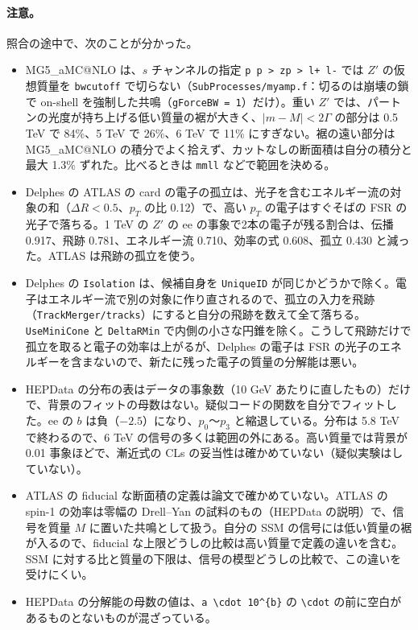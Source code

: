 \documentclass[a4paper,10pt]{ltjsarticle}
\makeatletter
\newcommand{\MGaMC}{MG5\_aMC@NLO}
\makeatother
\begin{document}
\paragraph{注意。}照合の途中で、次のことが分かった。
\begin{itemize}
\item \MGaMC{} は、$s$ チャンネルの指定 \texttt{p p > zp > l+ l-} では $Z'$ の仮想質量を \texttt{bwcutoff} で切らない（\texttt{SubProcesses/myamp.f}：切るのは崩壊の鎖で on-shell を強制した共鳴（\texttt{gForceBW = 1}）だけ）。重い $Z'$ では、パートンの光度が持ち上げる低い質量の裾が大きく、$|m-M|<2\Gamma$ の部分は 0.5 TeV で 84\%、5 TeV で 26\%、6 TeV で 11\% にすぎない。裾の遠い部分は \MGaMC{} の積分でよく拾えず、カットなしの断面積は自分の積分と最大 1.3\% ずれた。比べるときは \texttt{mmll} などで範囲を決める。
\item Delphes の ATLAS の card の電子の孤立は、光子を含むエネルギー流の対象の和（$\Delta R<0.5$、$p_T$ の比 0.12）で、高い $p_T$ の電子はすぐそばの FSR の光子で落ちる。1 TeV の $Z'$ の ee の事象で2本の電子が残る割合は、伝播 0.917、飛跡 0.781、エネルギー流 0.710、効率の式 0.608、孤立 0.430 と減った。ATLAS は飛跡の孤立を使う。
\item Delphes の \texttt{Isolation} は、候補自身を \texttt{UniqueID} が同じかどうかで除く。電子はエネルギー流で別の対象に作り直されるので、孤立の入力を飛跡（\texttt{TrackMerger/tracks}）にすると自分の飛跡を数えて全て落ちる。\texttt{UseMiniCone} と \texttt{DeltaRMin} で内側の小さな円錐を除く。こうして飛跡だけで孤立を取ると電子の効率は上がるが、Delphes の電子は FSR の光子のエネルギーを含まないので、新たに残った電子の質量の分解能は悪い。
\item HEPData の分布の表はデータの事象数（10 GeV あたりに直したもの）だけで、背景のフィットの母数はない。疑似コードの関数を自分でフィットした。ee の $b$ は負（$-2.5$）になり、$p_0$〜$p_3$ と縮退している。分布は 5.8 TeV で終わるので、6 TeV の信号の多くは範囲の外にある。高い質量では背景が 0.01 事象ほどで、漸近式の CLs の妥当性は確かめていない（疑似実験はしていない）。
\item ATLAS の fiducial な断面積の定義は論文で確かめていない。ATLAS の spin-1 の効率は零幅の Drell--Yan の試料のもの（HEPData の説明）で、信号を質量 $M$ に置いた共鳴として扱う。自分の SSM の信号には低い質量の裾が入るので、fiducial な上限どうしの比較は高い質量で定義の違いを含む。SSM に対する比と質量の下限は、信号の模型どうしの比較で、この違いを受けにくい。
\item HEPData の分解能の母数の値は、\texttt{a \textbackslash cdot 10\^{}\{b\}} の \texttt{\textbackslash cdot} の前に空白があるものとないものが混ざっている。
\end{itemize}
\end{document}
